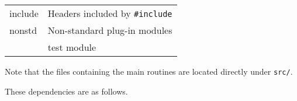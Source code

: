 \begin{longtable}[]{@{}ll@{}}
\begin{minipage}[t]{0.47\columnwidth}\raggedright
include\strut
\end{minipage} & \begin{minipage}[t]{0.47\columnwidth}\raggedright
Headers included by {\texttt{\#include}}\strut
\end{minipage}\tabularnewline
\begin{minipage}[t]{0.47\columnwidth}\raggedright
nonstd\strut
\end{minipage} & \begin{minipage}[t]{0.47\columnwidth}\raggedright
Non-standard plug-in modules\strut
\end{minipage}\tabularnewline
\begin{minipage}[t]{0.47\columnwidth}\raggedright
\strut
\end{minipage} & \begin{minipage}[t]{0.47\columnwidth}\raggedright
test module\strut
\end{minipage}\tabularnewline
\bottomrule
\end{longtable}

Note that the files containing the main routines are located directly
under {\texttt{src/}}.

These dependencies are as follows.

